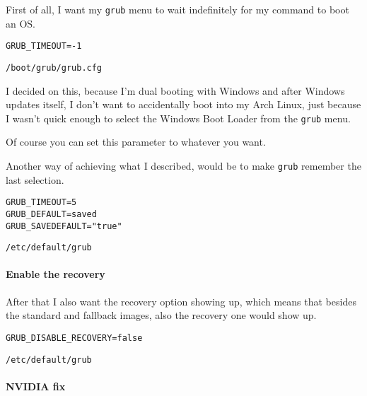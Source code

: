 \documentclass[10pt]{dustdoc}
\begin{document}
First of all, I want my \texttt{grub} menu to wait indefinitely for my command to boot an OS.

\begin{mintedlisting}
    \begin{verbatim}
GRUB_TIMEOUT=-1
    \end{verbatim}

    \caption{\texttt{/boot/grub/grub.cfg}}
\end{mintedlisting}

\begin{NOTE}
    I decided on this, because I’m dual booting with Windows and after Windows updates itself, I don’t want to accidentally boot into my Arch Linux, just because I wasn’t quick enough to select the Windows Boot Loader from the \texttt{grub} menu.

    Of course you can set this parameter to whatever you want.

    Another way of achieving what I described, would be to make \texttt{grub} remember the last selection.

    \begin{mintedlisting}
        \begin{verbatim}
GRUB_TIMEOUT=5
GRUB_DEFAULT=saved
GRUB_SAVEDEFAULT="true"
        \end{verbatim}

        \caption{\texttt{/etc/default/grub}}
    \end{mintedlisting}
\end{NOTE}

\paragraph{Enable the recovery}
\label{par:enable-the-recovery}

After that I also want the recovery option showing up, which means that besides the standard and fallback images, also the recovery one would show up.

\begin{mintedlisting}
    \begin{verbatim}
GRUB_DISABLE_RECOVERY=false
    \end{verbatim}

    \caption{\texttt{/etc/default/grub}}
\end{mintedlisting}

\paragraph{NVIDIA fix}
\label{par:nvidia-fix}
\end{document}

